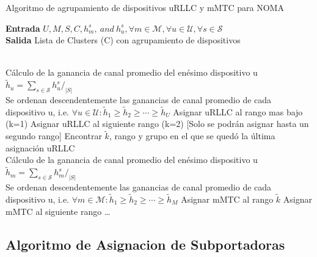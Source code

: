 \begin{algorithm}
    \caption{Algoritmo de agrupamiento de dispositivos uRLLC y mMTC para NOMA}\label{A1}
    \hspace*{\algorithmicindent} \textbf{Entrada} $U, M, S, C, h_{m}^{s} , \ and \ h_{u}^{s} ,\forall m \in \mathcal {M} , \forall u \in \mathcal {U} , \forall s \in \mathcal {S}$  \\
    \hspace*{\algorithmicindent} \textbf{Salida} Lista de Clusters (C) con agrupamiento de dispositivos 
    \begin{algorithmic}[1]
    \\
    Cálculo de la ganancia de canal promedio del enésimo dispositivo u\\
    ${\tilde h_{u}} =\sum \nolimits _{s \in \mathcal {S}} {h_{u}^{s}}{/_{|S|}}$\\
    Se ordenan descendentemente las ganancias de canal promedio de cada dispositivo u, i.e. $\forall u \in \mathcal {U} : {\tilde h_{1}} \geq {\tilde h_{2}} \geq \cdots \geq {\tilde h_{U}}$ 
        \State Asignar uRLLC al rango mas bajo (k=1)
        \Else
        \State Asignar uRLLC al siguiente rango (k=2) [Solo se podrán asignar hasta un segundo rango]
        \EndIf
    \EndFor
    \State Encontrar ${\tilde k}$, rango y grupo en el que se quedó la última asignación uRLLC
    \EndProcedure
    \\
    Cálculo de la ganancia de canal promedio del enésimo dispositivo u\\
    ${\tilde h_{m}} =\sum \nolimits _{s \in \mathcal {S}} {h_{m}^{s}}{/_{|S|}}$\\
    Se ordenan descendentemente las ganancias de canal promedio de cada dispositivo u, i.e. $\forall m \in \mathcal {M} : {\tilde h_{1}} \geq {\tilde h_{2}} \geq \cdots \geq {\tilde h_{M}}$ 
        \State Asignar mMTC al rango ${\tilde k}$
        \Else
        \State Asignar mMTC al siguiente rango \ldots
        \EndIf
    \EndFor
    \EndProcedure
    \end{algorithmic}
\end{algorithm}


\subsection{Algoritmo de Asignacion de Subportadoras}

